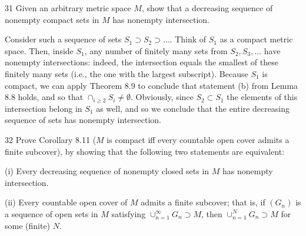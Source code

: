 \begin{exercise}{31}
    Given an arbitrary metric space $M$, show that a decreasing sequence of nonempty compact sets in $M$ has nonempty intersection.
\end{exercise}

\begin{solution}
    
    Consider such a sequence of sets $S_1 \supset S_2 \supset \ldots$.
    Think of $S_1$ as a compact metric space.
    Then, inside $S_1$, any number of finitely many sets from $S_2, S_3, \ldots$ have nonempty intersections: indeed, the intersection equals the smallest of these finitely many sets (i.e., the one with the largest subscript).
    Because $S_1$ is compact, we can apply Theorem 8.9 to conclude that statement (b) from Lemma 8.8 holds, and so that $\cap_{i \geq 2} S_i \neq \emptyset$.
    Obviously, since $S_2 \subset S_1$ the elements of this intersection belong in $S_1$ as well, and so we conclude that the entire decreasing sequence of sets has nonempty intersection.
\end{solution}

\newpage

\begin{exercise}{32}
    Prove Corollary 8.11 ($M$ is compact iff every countable open cover admits a finite subcover), by showing that the following two statements are equivalent:

    (i) Every decreasing sequence of nonempty closed sets in $M$ has nonempty intersection.

    (ii) Every countable open cover of $M$ admits a finite subcover; that is, if $(G_n)$ is a sequence of open sets in $M$ satisfying $\cup_{n=1}^{\infty} G_n \supset M$, then $\cup_{n=1}^{N} G_n \supset M$ for some (finite) $N$.
\end{exercise}

